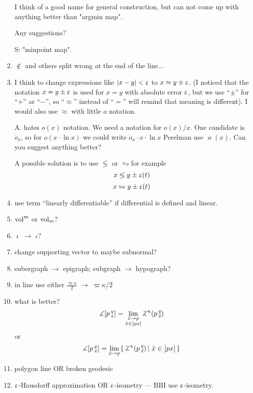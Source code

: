 \begin{enumerate}
I think of a good name for general construction,
but can not come up with anything better than
"argmin map".

Any suggestions?

S: "minpoint map".

\item $\not\in$ and others split wrong at the end of the line...

\item I think to change expressions like $|x-y|<\upvarepsilon$ to $x\approx y\pm \eps$.
(I noticed that the notation $x=y\pm \upvarepsilon$ is used for $x=y$ with absolute error $\upvarepsilon$,
but we use ``$\pm$'' for ``$+$'' ar ``$-$'', so ``$\approx$'' instead of ``$=$'' will remind that meaning is different).
\subitem I would also use $\approx$ with little $o$ notation.

\subitem A. hates $o(x)$ notation.
We need a notation for $o(x)/x$. 
One candidate is $\dot o_x$, so for $o(x\cdot\ln x)$ we could write $\dot o_x\cdot x\cdot\ln x$ 
Perelman use $\varkappa(x)$.
Can you suggest anything better?


\subitem A possible solution is to use $\lessgtr$ or $\leftrightharpoons$for example
\[x\lessgtr y\pm \upvarepsilon(t)\]
\[x\leftrightharpoons y\pm \upvarepsilon(t)\]
\item use term ``linearly differentiable'' if differential is defined and linear.

\item $\mathop{\rm vol}\nolimits^m$ or $\mathop{\rm vol}\nolimits_m$?

\item $\imath$ $\to$ $\iota$?

\item change supporting vector to maybe subnormal?

\item subergraph $\to$ epigraph; subgraph $\to$ hypograph? 

\item in line use either $\tfrac{\varpi\kappa}{2}$ $\to$ $\varpi\kappa/2$

\item what is better?
\[\mangle\hinge p q x
=
\lim_{
\substack{
\bar x\to p
\\
\bar x\in\,\l]px\r]}}\angk\kappa p q{\bar x}\]
or 
\[\mangle\hinge p q x
=
\lim_{\bar x\to p}
\set{\angk\kappa p q{\bar x}}{\bar x\in\,\l]px\r]}\]

\item polygon line OR broken geodesic

\item $\upvarepsilon$-Hausdorff approximation OR $\upvarepsilon$-isometry --- BBI use  $\upvarepsilon$-isometry.


\end{enumerate}
